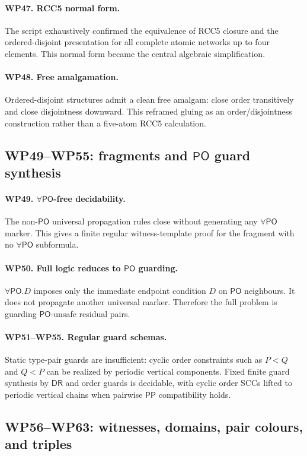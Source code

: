 \documentclass[11pt]{article}
\newcommand{\PP}{\mathsf{PP}}
\newcommand{\PO}{\mathsf{PO}}
\newcommand{\DR}{\mathsf{DR}}
\begin{document}
\paragraph{WP47. RCC5 normal form.}
The script exhaustively confirmed the equivalence of RCC5 closure and the ordered-disjoint presentation for all complete atomic networks up to four elements.  This normal form became the central algebraic simplification.

\paragraph{WP48. Free amalgamation.}
Ordered-disjoint structures admit a clean free amalgam: close order transitively and close disjointness downward.  This reframed gluing as an order/disjointness construction rather than a five-atom RCC5 calculation.

\subsection{WP49--WP55: fragments and $\PO$ guard synthesis}
\paragraph{WP49. $\forall\PO$-free decidability.}
The non-$\PO$ universal propagation rules close without generating any $\forall\PO$ marker.  This gives a finite regular witness-template proof for the fragment with no $\forall\PO$ subformula.

\paragraph{WP50. Full logic reduces to $\PO$ guarding.}
$\forall\PO.D$ imposes only the immediate endpoint condition $D$ on $\PO$ neighbours.  It does not propagate another universal marker.  Therefore the full problem is guarding $\PO$-unsafe residual pairs.

\paragraph{WP51--WP55. Regular guard schemas.}
Static type-pair guards are insufficient: cyclic order constraints such as $P<Q$ and $Q<P$ can be realized by periodic vertical components.  Fixed finite guard synthesis by $\DR$ and order guards is decidable, with cyclic order SCCs lifted to periodic vertical chains when pairwise $\PP$ compatibility holds.

\subsection{WP56--WP63: witnesses, domains, pair colours, and triples}
\end{document}
